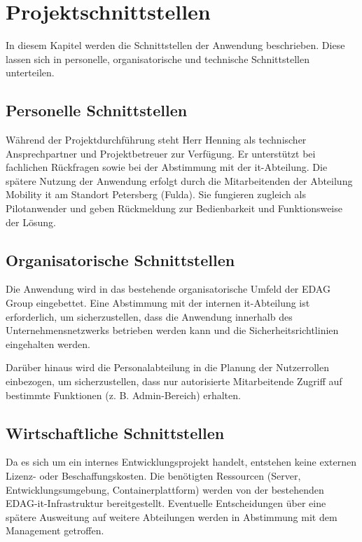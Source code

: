 \documentclass[11pt,a4paper]{report}
\begin{document}
\section{Projektschnittstellen}

In diesem Kapitel werden die Schnittstellen der Anwendung beschrieben. Diese lassen sich in personelle, organisatorische und technische Schnittstellen unterteilen.

\subsection{Personelle Schnittstellen}

Während der Projektdurchführung steht Herr Henning als technischer Ansprechpartner und Projektbetreuer zur Verfügung. Er unterstützt bei fachlichen Rückfragen sowie bei der Abstimmung mit der \gls{it}-Abteilung.
Die spätere Nutzung der Anwendung erfolgt durch die Mitarbeitenden der Abteilung Mobility \gls{it} am Standort Petersberg (Fulda). Sie fungieren zugleich als Pilotanwender und geben Rückmeldung zur Bedienbarkeit und Funktionsweise der Lösung.

\subsection{Organisatorische Schnittstellen}

Die Anwendung wird in das bestehende organisatorische Umfeld der EDAG Group eingebettet. Eine Abstimmung mit der internen \gls{it}-Abteilung ist erforderlich, um sicherzustellen, dass die Anwendung innerhalb des Unternehmensnetzwerks betrieben werden kann und die Sicherheitsrichtlinien eingehalten werden.


Darüber hinaus wird die Personalabteilung in die Planung der Nutzerrollen einbezogen, um sicherzustellen, dass nur autorisierte Mitarbeitende Zugriff auf bestimmte Funktionen (z. B. Admin-Bereich) erhalten.

\subsection{Wirtschaftliche Schnittstellen}

Da es sich um ein internes Entwicklungsprojekt handelt, entstehen keine externen Lizenz- oder Beschaffungskosten. Die benötigten Ressourcen (Server, Entwicklungsumgebung, Containerplattform) werden von der bestehenden EDAG-\gls{it}-Infrastruktur bereitgestellt. Eventuelle Entscheidungen über eine spätere Ausweitung auf weitere Abteilungen werden in Abstimmung mit dem Management getroffen.
\end{document}
